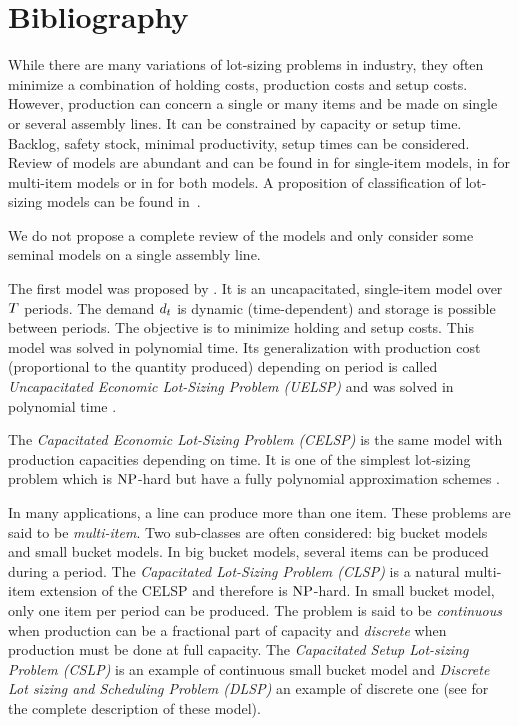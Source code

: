 \section{Bibliography}
\label{sec:PDP:deterministic:bibliography}

While there are many variations of lot-sizing problems in industry, they often minimize a combination of holding costs, production costs and setup costs.
However, production can concern a single or many items and be made on single or several assembly lines.
It can be constrained by capacity or setup time.
Backlog, safety stock, minimal productivity, setup times can be considered.
Review of models are abundant and can be found in \cite{Geunes2014} for single-item models, in \cite{Gicquel2008} for multi-item models or in \cite{Karimi2003} for both models. A proposition of classification of lot-sizing models can be found in~\cite[Chapter 4 and 12]{Pochet2006}.

We do not propose a complete review of the models and only consider some seminal models on a single assembly line.

\medskip

The first model was proposed by \cite{Wagner1958}.
It is an uncapacitated, single-item model over $T$ periods.
The demand $d_t$ is dynamic (\ie time-dependent) and storage is possible between periods.
The objective is to minimize holding and setup costs.
This model was solved in polynomial time.
Its generalization with production cost (proportional to the quantity produced) depending on period is called \emph{Uncapacitated Economic Lot-Sizing Problem (UELSP)} and was solved in polynomial time \cite{Federgruen1991,Wagelmans1992,Aggarwal1993}.


The \emph{Capacitated Economic Lot-Sizing Problem (CELSP)} is the same model with production capacities depending on time.
It is one of the simplest lot-sizing problem which is $\operatorname{NP}$-hard \cite{Florian1980} but have a fully polynomial approximation schemes \cite{vanHoesel2001}.

\medskip

In many applications, a line can produce more than one item.
These problems are said to be \emph{multi-item}.
Two sub-classes are often considered: big bucket models and small bucket models.
In big bucket models, several items can be produced during a period.
The \emph{Capacitated Lot-Sizing Problem (CLSP)} is a natural multi-item extension of the CELSP and therefore is $\operatorname{NP}$-hard.
In small bucket model, only one item per period can be produced.
The problem is said to be \emph{continuous} when production can be a fractional part of capacity and \emph{discrete} when production must be done at full capacity.
The \emph{Capacitated Setup Lot-sizing Problem (CSLP)} is an example of continuous small bucket model and \emph{Discrete Lot sizing and Scheduling Problem (DLSP)} an example of discrete one (see \cite{Gicquel2008} for the complete description of these model).



